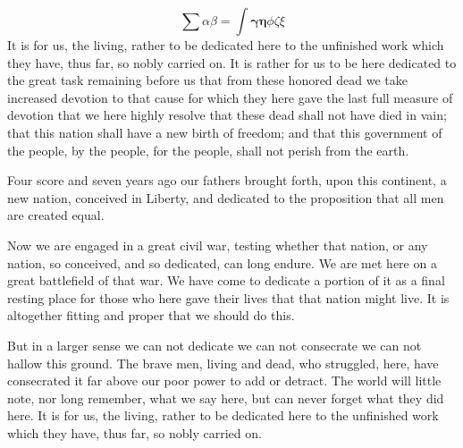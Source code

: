 \documentclass{roffin}
\begin{document}
\begin{equation}
\sum\alpha\beta=\bm{\int\gamma\eta}\phi\zeta\xi
\end{equation}
It is for us, the living, rather to be dedicated here to the unfinished work
which they have, thus far, so nobly carried on. It is rather for us to be here dedicated to the great task remaining before us that
from these honored dead we take increased devotion to that cause for which they here gave the last full measure of devotion that
we here highly resolve that these dead shall not have died in vain; that this nation shall have a new birth of freedom; and that this
government of the people, by the people, for the people, shall not perish from the earth.

\begin{table}
\end{table}


Four score and seven years ago our fathers brought forth,
upon this continent, a new nation, conceived in Liberty, and dedicated to
the proposition that all men are created equal.

Now we are engaged in a great civil war, testing whether that nation, or any nation, so conceived, and so dedicated, can long endure.
We are met here on a great battlefield of that war. We have come to dedicate a portion of it as a final resting place for those who
here gave their lives that that nation might live. It is altogether fitting and proper that we should do this.

\begin{theorem}
But in a larger sense we can not dedicate we can not consecrate we can not hallow this ground. The brave men, living and dead,
who struggled, here, have consecrated it far above our poor power to add or detract. The world will little note, nor long remember,
what we say here, but can never forget what they did here. It is for us, the living, rather to be dedicated here to the unfinished work
which they have, thus far, so nobly carried on.
\end{theorem}
\end{document}
